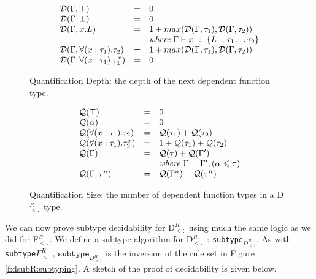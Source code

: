 \documentclass[runningheads, anon]{llncs}
\begin{document}
\begin{figure}[t]
\begin{minipage}{\linewidth}
\[
\begin{array}{lcl}
\mathcal{D}(\Gamma, \top)
			& =
			& 0 \\
\mathcal{D}(\Gamma, \bot)
			& =
			& 0 \\
\mathcal{D}(\Gamma, x.L)
			& =
			& 1 + max(\mathcal{D}(\Gamma, \tau_1),  \mathcal{D}(\Gamma, \tau_2)) \\

			&
			& \textit{where}\ \Gamma \vdash x\ :\ \nonRec{}{\typeDef{L}{\tau_1}{\tau_2}} \\
\mathcal{D}(\Gamma, \allType{x}{\tau_1}{\tau_2})
			& =
			& 1 + max(\mathcal{D}(\Gamma, \tau_1), \mathcal{D}(\Gamma, \tau_2)) \\
\mathcal{D}(\Gamma, \allType{x}{\tau_1}{\tau_1^x})
			& =
			& 0
\end{array}
\]
\caption{Quantification Depth: the depth of the next dependent function type.}
\label{f:dsub:depfunDepth}
\end{minipage}
\end{figure}

\begin{figure}[t]
\begin{minipage}{\linewidth}
\[
\begin{array}{lcl}
\mathcal{Q}(\top)
			& =
			& 0 \\
\mathcal{Q}(\alpha)
			& =
			& 0 \\
\mathcal{Q}( \forall (x:\tau_1).\tau_2)
			& =
			& \mathcal{Q}(\tau_1) + \mathcal{Q}(\tau_2)  \\
\mathcal{Q}( \forall (x:\tau_1).\tau_2^x)
			& =
			& 1 + \mathcal{Q}(\tau_1) + \mathcal{Q}(\tau_2)\\
\mathcal{Q}(\Gamma)
			& =
			& \mathcal{Q}(\tau) + \mathcal{Q}(\Gamma') \\

			&
			& \textit{where}\ \Gamma = \Gamma', (\alpha \leqslant \tau)\\
\mathcal{Q}(\Gamma, \tau^n)
			& =
			& \mathcal{Q}(\Gamma^n) + \mathcal{Q}(\tau^n)
			
\end{array}
\]
\caption{Quantification Size: the number of dependent function types in a D$_{<:}^R$ type.}
\label{f:dsub:depfunSize}
\end{minipage}
\end{figure}

We can now prove subtype decidability for D$_{<:}^R$ using much the same logic as we did for F$_{<:}^R$. 
We define a 
subtype algorithm for D$_{<:}^R$ : \texttt{subtype}$_{D_{<:}^R}$.
As with \texttt{subtype}$F_{<:}^R$, $\texttt{subtype}_{D_{<:}^R}$ is the inversion of the rule set in Figure \ref{f:dsubR:subtyping}.
A sketch of the proof of decidability is given below.
\end{document}

